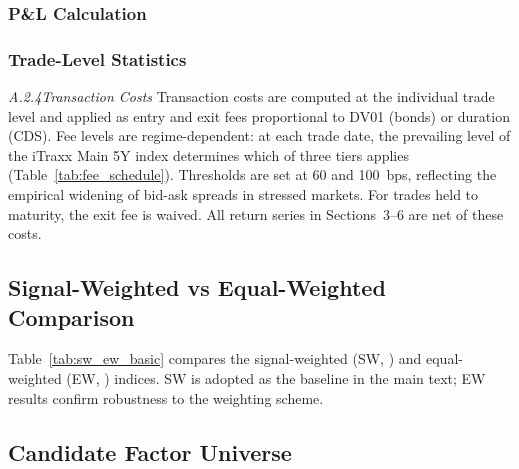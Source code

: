 

\subsubsection{P\&L Calculation}
\label{app:pnl}

\subsubsection{Trade-Level Statistics}
\label{app:trade_stats}



\noindent\textit{A.2.4\quad Transaction Costs}
\label{app:fees}
Transaction costs are computed at the individual trade level and applied
as entry and exit fees proportional to DV01 (bonds) or duration (CDS).
Fee levels are regime-dependent: at each trade date, the prevailing level
of the iTraxx Main 5Y index determines which of three tiers applies
(Table~\ref{tab:fee_schedule}). Thresholds are set at 60 and 100~bps,
reflecting the empirical widening of bid-ask spreads in stressed markets.
For trades held to maturity, the exit fee is waived. All return series
in Sections~3--6 are net of these costs.



\subsection{Signal-Weighted vs Equal-Weighted Comparison}
\label{app:sw_ew}

Table~\ref{tab:sw_ew_basic} compares the signal-weighted (SW,
\citealp{rebonato2021convexity}) and equal-weighted (EW,
\citealp{duarte2007risk}) indices. SW is adopted as the baseline in the
main text; EW results confirm robustness to the weighting scheme.




\subsection{Candidate Factor Universe}
\label{app:factors}

